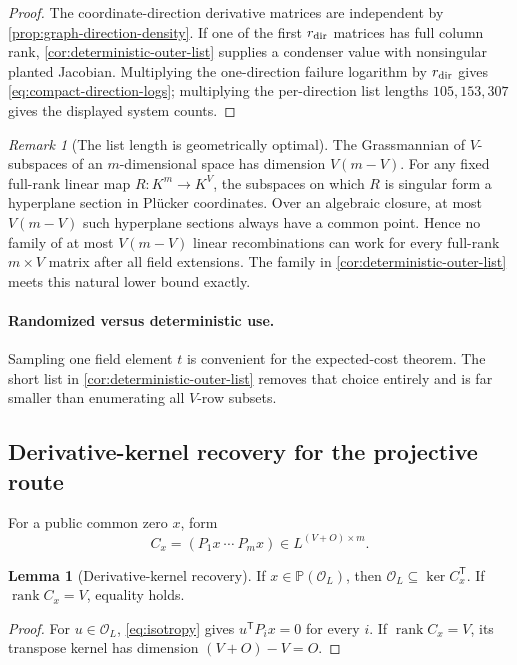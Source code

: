 \documentclass[11pt,a4paper]{article}
\theoremstyle{definition}
\newtheorem{lemma}[theorem]{Lemma}
\theoremstyle{remark}
\newtheorem{remark}[theorem]{Remark}
\newcommand{\PP}{\mathbb P}
\newcommand{\cO}{\mathcal O}
\newcommand{\rank}{\operatorname{rank}}
\newcommand{\trans}{\mathsf T}
\begin{document}
\begin{proof}
The coordinate-direction derivative matrices are independent by \cref{prop:graph-direction-density}.  If one of the first $r_{\rm dir}$ matrices has full column rank, \cref{cor:deterministic-outer-list} supplies a condenser value with nonsingular planted Jacobian.  Multiplying the one-direction failure logarithm by $r_{\rm dir}$ gives \eqref{eq:compact-direction-logs}; multiplying the per-direction list lengths $105,153,307$ gives the displayed system counts.
\end{proof}

\begin{remark}[The list length is geometrically optimal]\label{rem:condenser-optimal}
The Grassmannian of $V$-subspaces of an $m$-dimensional space has dimension $V(m-V)$.  For any fixed full-rank linear map $R:K^m\to K^V$, the subspaces on which $R$ is singular form a hyperplane section in Pl\"ucker coordinates.  Over an algebraic closure, at most $V(m-V)$ such hyperplane sections always have a common point.  Hence no family of at most $V(m-V)$ linear recombinations can work for every full-rank $m\times V$ matrix after all field extensions.  The family in \cref{cor:deterministic-outer-list} meets this natural lower bound exactly.
\end{remark}

\paragraph{Randomized versus deterministic use.}
Sampling one field element $t$ is convenient for the expected-cost theorem.  The short list in \cref{cor:deterministic-outer-list} removes that choice entirely and is far smaller than enumerating all $V$-row subsets.

\subsection{Derivative-kernel recovery for the projective route}

For a public common zero $x$, form
\[
C_x=(P_1x\ \cdots\ P_mx)\in L^{(V+O)\times m}.
\]

\begin{lemma}[Derivative-kernel recovery]\label{lem:kernel}
If $x\in\PP(\cO_L)$, then $\cO_L\subseteq\ker C_x^{\trans}$.  If $\rank C_x=V$, equality holds.
\end{lemma}

\begin{proof}
For $u\in\cO_L$, \eqref{eq:isotropy} gives $u^{\trans}P_ix=0$ for every $i$.  If $\rank C_x=V$, its transpose kernel has dimension $(V+O)-V=O$.
\end{proof}
\end{document}
